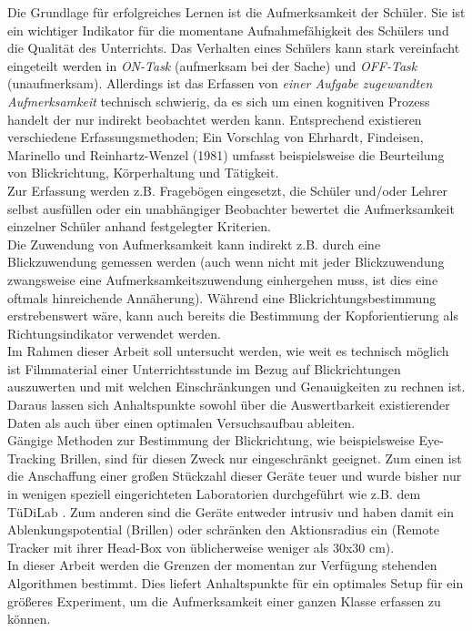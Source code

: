 \label{intension}
Die Grundlage für erfolgreiches Lernen ist die Aufmerksamkeit der Schüler. Sie ist ein wichtiger Indikator für die momentane Aufnahmefähigkeit des Schülers und die Qualität des Unterrichts. Das Verhalten eines Schülers kann stark vereinfacht eingeteilt werden in \textit{ON-Task} (aufmerksam bei der Sache) und \textit{OFF-Task} (unaufmerksam). Allerdings ist das Erfassen von \textit{einer Aufgabe zugewandten Aufmerksamkeit} technisch schwierig, da es sich um einen kognitiven Prozess handelt der nur indirekt beobachtet werden kann. Entsprechend existieren verschiedene Erfassungsmethoden; Ein Vorschlag von Ehrhardt, Findeisen, Marinello und Reinhartz-Wenzel (1981) umfasst beispielsweise die Beurteilung von Blickrichtung, Körperhaltung und Tätigkeit.\\
Zur Erfassung werden z.B. Fragebögen eingesetzt, die Schüler und/oder Lehrer selbst ausfüllen oder ein unabhängiger Beobachter bewertet die Aufmerksamkeit einzelner Schüler anhand festgelegter Kriterien.\\
Die Zuwendung von Aufmerksamkeit kann indirekt z.B. durch eine Blickzuwendung gemessen werden (auch wenn nicht mit jeder Blickzuwendung zwangsweise eine Aufmerksamkeitszuwendung einhergehen muss, ist dies eine oftmals hinreichende Annäherung). Während eine Blickrichtungsbestimmung erstrebenswert wäre, kann auch bereits die Bestimmung der Kopforientierung als Richtungsindikator verwendet werden.\\
Im Rahmen dieser Arbeit soll untersucht werden, wie weit es technisch möglich ist Filmmaterial einer Unterrichtsstunde im Bezug auf Blickrichtungen auszuwerten und mit welchen Einschränkungen und Genauigkeiten zu rechnen ist. Daraus lassen sich Anhaltspunkte sowohl über die Auswertbarkeit existierender Daten als auch über einen optimalen Versuchsaufbau ableiten.\\
Gängige Methoden zur Bestimmung der Blickrichtung, wie beispielsweise Eye-Tracking Brillen, sind für diesen Zweck nur eingeschränkt geeignet. Zum einen ist die Anschaffung einer großen Stückzahl dieser Geräte teuer und wurde bisher nur in wenigen speziell eingerichteten Laboratorien durchgeführt wie z.B. dem TüDiLab \cite{TueDiLab}. Zum anderen sind die Geräte entweder intrusiv und haben damit ein Ablenkungspotential (Brillen) oder schränken den Aktionsradius ein (Remote Tracker mit ihrer Head-Box von üblicherweise weniger als 30x30 cm).\\
In dieser Arbeit werden die Grenzen der momentan zur Verfügung stehenden Algorithmen bestimmt. Dies liefert Anhaltspunkte für ein optimales Setup für ein größeres Experiment, um die Aufmerksamkeit einer ganzen Klasse erfassen zu können.\\
